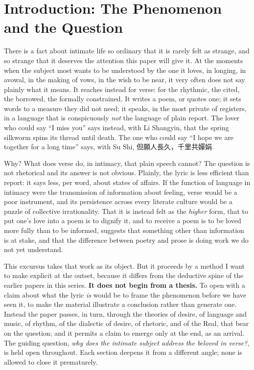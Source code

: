 \section{Introduction: The Phenomenon and the Question}\label{p08:sec:intro}

There is a fact about intimate life so ordinary that it is rarely felt as strange, and so strange that it deserves the attention this paper will give it. At the moments when the subject most wants to be understood by the one it loves, in longing, in avowal, in the making of vows, in the wish to be near, it very often does not say plainly what it means. It reaches instead for verse: for the rhythmic, the cited, the borrowed, the formally constrained. It writes a poem, or quotes one; it sets words to a measure they did not need; it speaks, in the most private of registers, in a language that is conspicuously \emph{not} the language of plain report. The lover who could say ``I miss you'' says instead, with Li Shangyin, that the spring silkworm spins its thread until death. The one who could say ``I hope we are together for a long time'' says, with Su Shi, \cjkfont 但願人長久，千里共嬋娟\normalfont.

Why? What does verse do, in intimacy, that plain speech cannot? The question is not rhetorical and its answer is not obvious. Plainly, the lyric is less efficient than report: it says less, per word, about states of affairs. If the function of language in intimacy were the transmission of information about feeling, verse would be a poor instrument, and its persistence across every literate culture would be a puzzle of collective irrationality. That it is instead felt as the \emph{higher} form, that to put one's love into a poem is to dignify it, and to receive a poem is to be loved more fully than to be informed, suggests that something other than information is at stake, and that the difference between poetry and prose is doing work we do not yet understand.

This excursus takes that work as its object. But it proceeds by a method I want to make explicit at the outset, because it differs from the deductive spine of the earlier papers in this series. \textbf{It does not begin from a thesis.} To open with a claim about what the lyric \emph{is} would be to frame the phenomenon before we have seen it, to make the material illustrate a conclusion rather than generate one. Instead the paper passes, in turn, through the theories of desire, of language and music, of rhythm, of the dialectic of desire, of rhetoric, and of the Real, that bear on the question; and it permits a claim to emerge only at the end, as an arrival. The guiding question, \emph{why does the intimate subject address the beloved in verse?}, is held open throughout. Each section deepens it from a different angle; none is allowed to close it prematurely.

